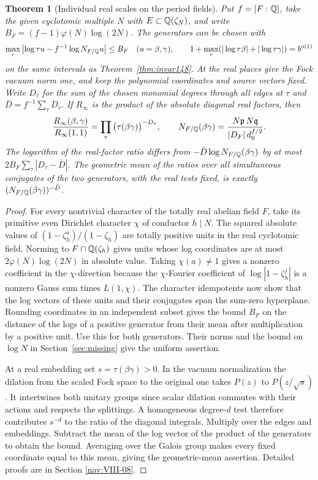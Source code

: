 \documentclass[a4paper,11pt]{article}
\newtheorem{theorem}[proposition]{Theorem}
\theoremstyle{definition}
\theoremstyle{remark}
\numberwithin{equation}{section}
\begin{document}
\begin{theorem}[Individual real scales on the period fields]
\label{thm:units180}
Put \(f=[F:\mathbb Q]\), take the given cyclotomic multiple \(N\)
with \(E\subset\mathbb Q(\zeta_N)\), and write
\(B_F=(f-1)\varphi(N)\log(2N)\).
The generators can be chosen with
\[
 \max_\tau\left|\log\tau u-f^{-1}\log N_{F/\mathbb Q}u\right|
       \le B_F\quad(u=\beta,\gamma),\qquad
 1+\max_\tau(|\log\tau\beta|+|\log\tau\gamma|)=b^{o(1)}
\]
on the same intervals as Theorem~\ref{thm:invar148}.
At the real places give the Fock vacuum norm one, and keep
the polynomial coordinates and source vectors fixed. Write
\(D_\tau\) for the sum of the chosen monomial degrees through
all edges at \(\tau\) and \(\bar D=f^{-1}\sum_\tau D_\tau\).
If \(R_\infty\) is the product of the absolute diagonal real
factors, then
\[
 \frac{R_\infty(\beta,\gamma)}{R_\infty(1,1)}
       =\prod_\tau\big(\tau(\beta\gamma)\big)^{-D_\tau},\qquad
 N_{F/\mathbb Q}(\beta\gamma)=
       \frac{N\mathfrak p\,N\mathfrak q}{|D_F|\,d_0^{f/2}} .
\]
The logarithm of the real-factor ratio differs from \(-\bar D\log N_{F/\mathbb Q}(\beta\gamma)\)
by at most \(2 B_F\sum_\tau|D_\tau-\bar D|\). The geometric
mean of the ratios over all simultaneous conjugates of the
two generators, with the real tests fixed, is exactly
\((N_{F/\mathbb Q}(\beta\gamma))^{-\bar D}\).
\end{theorem}
\begin{proof}
For every nontrivial character of the totally real abelian
field \(F\), take its primitive even Dirichlet character
\(\chi\) of conductor \(h\mid N\). The squared absolute
values of \((1-\zeta_h^a)/(1-\zeta_h)\) are totally
positive units in the real cyclotomic field. Norming to
\(F\cap\mathbb Q(\zeta_h)\) gives units whose log coordinates
are at most \(2\varphi(N)\log(2N)\) in absolute value.
Taking \(\chi(a)\ne1\) gives a nonzero coefficient in the
\(\chi\)-direction because the \(\chi\)-Fourier coefficient of
\(\log|1-\zeta_h^j|\) is a nonzero Gauss sum times
\(L(1,\chi)\). The character idempotents now show that
the log vectors of these units and their conjugates span
the sum-zero hyperplane. Rounding coordinates in an
independent subset gives the bound \(B_F\) on the distance
of the logs of a positive generator from their mean after
multiplication by a positive unit. Use this for both
generators. Their norms and the bound on \(\log N\) in
Section~\ref{sec:missing} give the uniform assertion.

At a real embedding set \(s=\tau(\beta\gamma)>0\). In the
vacuum normalization the dilation from the scaled Fock
space to the original one takes \(P(z)\) to
\(P(z/\sqrt s)\). It intertwines both unitary groups since
scalar dilation commutes with their actions and respects
the splittings. A homogeneous degree-\(d\) test therefore
contributes \(s^{-d}\) to the ratio of the diagonal
integrals. Multiply over the edges and embeddings. Subtract
the mean of the log vector of the product of the generators
to obtain the bound. Averaging over the Galois group makes
every fixed coordinate equal to this mean, giving the
geometric-mean assertion. Detailed proofs are in
Section \ref{nav:VIII-08}.
\end{proof}
\end{document}
